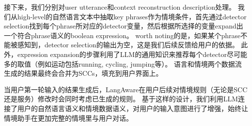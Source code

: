 接下来，我们分别对user utterance和context reconstruction description处理。
我们从high-level的自然语言文本中抽取key phrases作为情境条件，首先通过detector selection找到每个phrase所对应的detector变量，然后根据所选择的变量expand出一个符合phrase语义的boolean expression。
worth noting的是，如果某个phrase不能被感知到，detector selection的输出为空，这是我们后续反馈给用户的依据。
此外，expression expansion的步骤利用了LLM的通用知识来推荐每个detector尽可能多的取值（例如运动包括running, cycling, jumping等）。
语言和情境两个数据流生成的结果最终会合并为SCCs，填充到用户界面上。

当用户第一轮输入的结果生成后，LangAware在用户后续对情境规则（无论是SCC还是服务）修改时会同时考虑已生成的规则。
基于这样的设计，我们利用LLM连接了用户的自然语言语义和情境数据语义，对用户的输入意图进行了增强，始终让情境助手在更加完整的情境里与用户对话。









